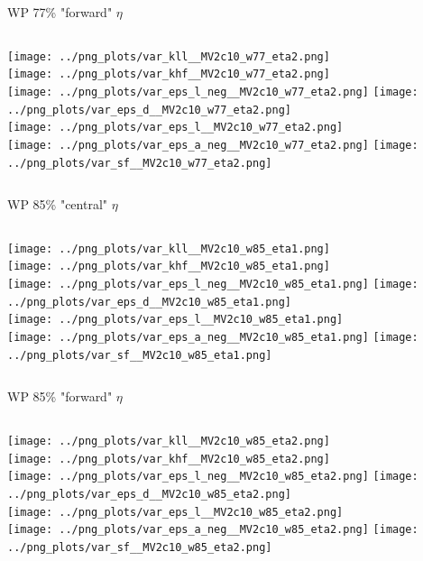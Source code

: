 \documentclass[pdflatex,8pt]{beamer}
\begin{document}
\begin{frame}{WP 77\% "forward" $\eta$}
  \begin{columns}[t]
    \centering
    \texttt{[image: ../png\_plots/var\_kll\_\_MV2c10\_w77\_eta2.png]}\\
    \texttt{[image: ../png\_plots/var\_khf\_\_MV2c10\_w77\_eta2.png]}\\
    \texttt{[image: ../png\_plots/var\_eps\_l\_neg\_\_MV2c10\_w77\_eta2.png]}
    \centering
    \texttt{[image: ../png\_plots/var\_eps\_d\_\_MV2c10\_w77\_eta2.png]}\\
    \texttt{[image: ../png\_plots/var\_eps\_l\_\_MV2c10\_w77\_eta2.png]}\\
    \texttt{[image: ../png\_plots/var\_eps\_a\_neg\_\_MV2c10\_w77\_eta2.png]}
    \texttt{[image: ../png\_plots/var\_sf\_\_MV2c10\_w77\_eta2.png]}
  \end{columns}
\end{frame}

\begin{frame}{WP 85\% "central" $\eta$}
  \begin{columns}[t]
    \centering
    \texttt{[image: ../png\_plots/var\_kll\_\_MV2c10\_w85\_eta1.png]}\\
    \texttt{[image: ../png\_plots/var\_khf\_\_MV2c10\_w85\_eta1.png]}\\
    \texttt{[image: ../png\_plots/var\_eps\_l\_neg\_\_MV2c10\_w85\_eta1.png]}
    \centering
    \texttt{[image: ../png\_plots/var\_eps\_d\_\_MV2c10\_w85\_eta1.png]}\\
    \texttt{[image: ../png\_plots/var\_eps\_l\_\_MV2c10\_w85\_eta1.png]}\\
    \texttt{[image: ../png\_plots/var\_eps\_a\_neg\_\_MV2c10\_w85\_eta1.png]}
    \texttt{[image: ../png\_plots/var\_sf\_\_MV2c10\_w85\_eta1.png]}
  \end{columns}
\end{frame}

\begin{frame}{WP 85\% "forward" $\eta$}
  \begin{columns}[t]
    \centering
    \texttt{[image: ../png\_plots/var\_kll\_\_MV2c10\_w85\_eta2.png]}\\
    \texttt{[image: ../png\_plots/var\_khf\_\_MV2c10\_w85\_eta2.png]}\\
    \texttt{[image: ../png\_plots/var\_eps\_l\_neg\_\_MV2c10\_w85\_eta2.png]}
    \centering
    \texttt{[image: ../png\_plots/var\_eps\_d\_\_MV2c10\_w85\_eta2.png]}\\
    \texttt{[image: ../png\_plots/var\_eps\_l\_\_MV2c10\_w85\_eta2.png]}\\
    \texttt{[image: ../png\_plots/var\_eps\_a\_neg\_\_MV2c10\_w85\_eta2.png]}
    \texttt{[image: ../png\_plots/var\_sf\_\_MV2c10\_w85\_eta2.png]}
  \end{columns}
\end{frame}
\end{document}
